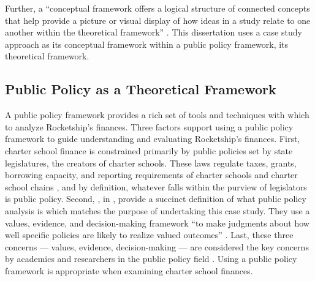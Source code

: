Further, a ``conceptual framework offers a logical structure of connected concepts that help provide a picture or visual display of how ideas in a study relate to one another within the theoretical framework'' \parencite[16–17]{Grant.Osanloo2014}. This dissertation uses a case study approach as its conceptual framework within a public policy framework, its theoretical framework. 

\subsection{Public Policy as a Theoretical Framework}\label{subsec:PublicPolicyFramework}\indent

A public policy framework provides a rich set of tools and techniques with which to analyze Rocketship's finances. Three factors support using a public policy framework to guide understanding and evaluating Rocketship's finances. First, charter school finance is constrained primarily by public policies set by state legislatures, the creators of charter schools. These laws regulate taxes, grants, borrowing capacity, and reporting requirements of charter schools and charter school chains \parencite{Aguinaldo.etal2020}, and by definition, whatever falls within the purview of legislators is public policy. Second, \textcite{Brighouse.etal2018}, in , provide a succinct definition of what public policy analysis is which matches the purpose of undertaking this case study. They use a values, evidence, and decision-making framework ``to make judgments about how well specific policies are likely to realize valued outcomes'' \parencite[p.1]{Brighouse.etal2018}. Last, these three concerns — values, evidence, decision-making — are considered the key concerns by academics and researchers in the public policy field \parencite{BuenoDeMesquita2016, Clemons.McBeth2021,Fowler2013,Gupta2011}. Using a public policy framework is appropriate when examining charter school finances.

